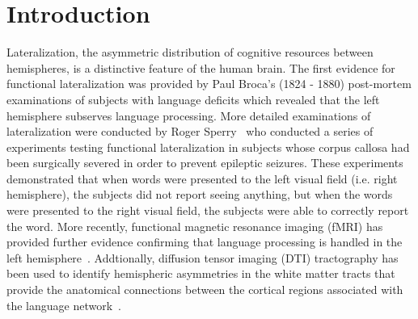 \section{Introduction}
\label{sec:intro}
Lateralization, the asymmetric distribution of cognitive resources between hemispheres, is a distinctive feature of the human brain. The first evidence for functional lateralization was provided by Paul Broca's (1824 - 1880) post-mortem examinations of subjects with language deficits which revealed that the left hemisphere subserves language processing. More detailed examinations of lateralization were conducted by Roger Sperry~\cite{Sperry1974} who conducted a series of experiments testing functional lateralization in subjects whose corpus callosa had been surgically severed in order to prevent epileptic seizures. These experiments demonstrated that when words were presented to the left visual field (i.e. right hemisphere), the subjects did not report seeing anything, but when the words were presented to the right visual field, the subjects were able to correctly report the word. More recently, functional magnetic resonance imaging (fMRI) has provided further evidence confirming that language processing is handled in the left hemisphere~\cite{Frost1999,Bookheimer2002}. Addtionally, diffusion tensor imaging (DTI) tractography has been used to identify hemispheric asymmetries in the white matter tracts that provide the anatomical connections between the cortical regions associated with the language network~\cite{Catani2008,Glasser2008}.
 
